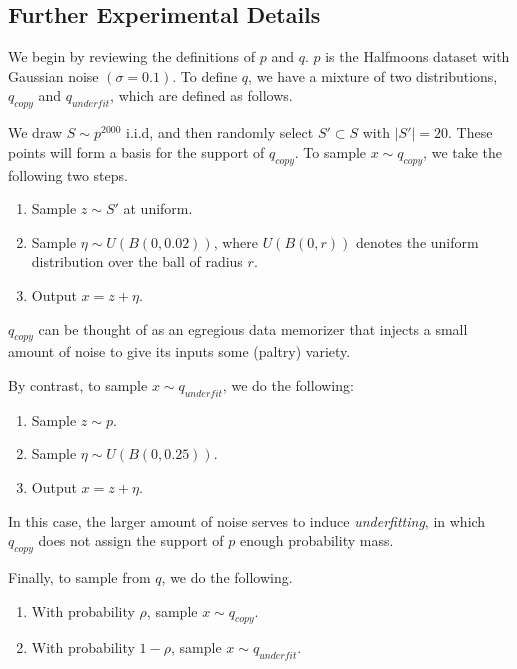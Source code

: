  \subsection{Further Experimental Details}\label{sec:experiments_details}

We begin by reviewing the definitions of $p$ and $q$. $p$ is the Halfmoons dataset with Gaussian noise $(\sigma = 0.1)$. To define $q$, we have a mixture of two distributions, $q_{copy}$ and $q_{underfit}$, which are defined as follows.

We draw $S \sim p^{2000}$ i.i.d, and then randomly select $S' \subset S$ with $|S'| = 20$. These points will form a basis for the support of $q_{copy}$. To sample $x \sim q_{copy}$, we take the following two steps.
\begin{enumerate}
	\item Sample $z \sim S'$ at uniform.
	\item Sample $\eta \sim U(B(0, 0.02))$, where $U(B(0, r))$ denotes the uniform distribution over the ball of radius $r$. 
	\item Output $x = z + \eta$.
\end{enumerate}
$q_{copy}$ can be thought of as an egregious data memorizer that injects a small amount of noise to give its inputs some (paltry) variety. 

By contrast, to sample $x \sim q_{underfit}$, we do the following:
\begin{enumerate}
	\item Sample $z \sim p$.
	\item Sample $\eta \sim U(B(0, 0.25))$.
	\item Output $x = z + \eta$.
\end{enumerate}
In this case, the larger amount of noise serves to induce \textit{underfitting}, in which $q_{copy}$ does not assign the support of $p$ enough probability mass. 

Finally, to sample from $q$, we do the following.
\begin{enumerate}
	\item With probability $\rho$, sample $x \sim q_{copy}$.
	\item With probability $1 - \rho$, sample $x \sim q_{underfit}$. 
\end{enumerate}


